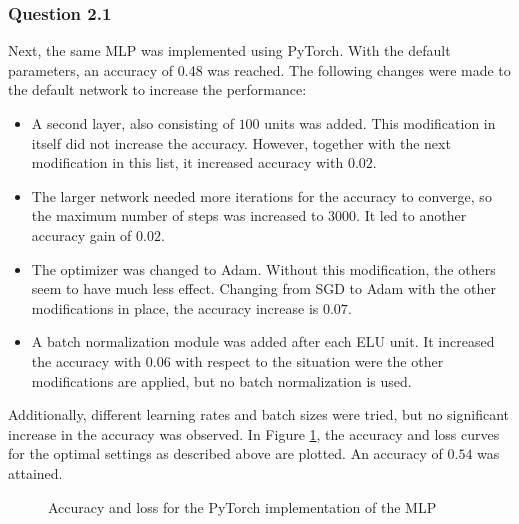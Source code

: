 \documentclass{article}
\begin{document}
\subsubsection*{Question 2.1}
Next, the same MLP was implemented using PyTorch. With the default parameters, an accuracy of 0.48 was reached. The following changes were made to the default network to increase the performance:
\begin{itemize}
	\item A second layer, also consisting of $100$ units was added. This modification in itself did not increase the accuracy. However, together with the next modification in this list, it increased accuracy with $0.02$.
	\item The larger network needed more iterations for the accuracy to converge, so the maximum number of steps was increased to $3000$. It led to another accuracy gain of $0.02$.
	\item The optimizer was changed to Adam. Without this modification, the others seem to have much less effect. Changing from SGD to Adam with the other modifications in place, the accuracy increase is $0.07$.
	\item A batch normalization module was added after each ELU unit. It increased the accuracy with $0.06$ with respect to the situation were the other modifications are applied, but no batch normalization is used.
\end{itemize}
Additionally, different learning rates and batch sizes were tried, but no significant increase in the accuracy was observed. In Figure \ref{fig:torchcurves}, the accuracy and loss curves for the optimal settings as described above are plotted. An accuracy of $0.54$ was attained.
\begin{figure}[H]
	\centering
	\caption{Accuracy and loss for the PyTorch implementation of the MLP}
	\label{fig:torchcurves}
\end{figure}
\end{document}

